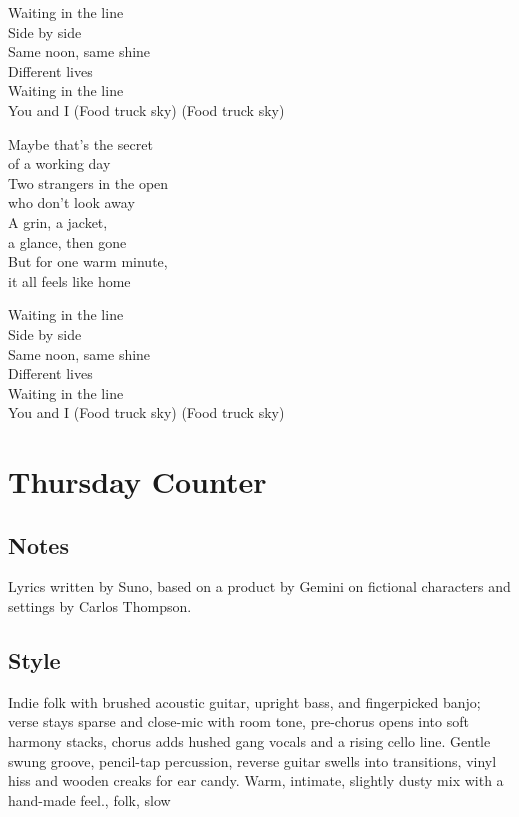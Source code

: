 \begin{lyrics}
Waiting in the line\\
Side by side\\
Same noon, same shine\\
Different lives\\
Waiting in the line\\
You and I
(Food truck sky)
(Food truck sky)

Maybe that’s the secret\\
of a working day\\
Two strangers in the open\\
who don’t look away\\
A grin, a jacket,\\
a glance, then gone\\
But for one warm minute,\\
it all feels like home

Waiting in the line\\
Side by side\\
Same noon, same shine\\
Different lives\\
Waiting in the line\\
You and I
(Food truck sky)
(Food truck sky)

\end{lyrics}

\section{Thursday Counter}

\subsection{Notes}
Lyrics written by Suno, based on a product by Gemini on fictional characters and settings by Carlos Thompson.

\subsection{Style}
Indie folk with brushed acoustic guitar, upright bass, and fingerpicked banjo; verse stays sparse and close-mic with room tone, pre-chorus opens into soft harmony stacks, chorus adds hushed gang vocals and a rising cello line. Gentle swung groove, pencil-tap percussion, reverse guitar swells into transitions, vinyl hiss and wooden creaks for ear candy. Warm, intimate, slightly dusty mix with a hand-made feel., folk, slow

